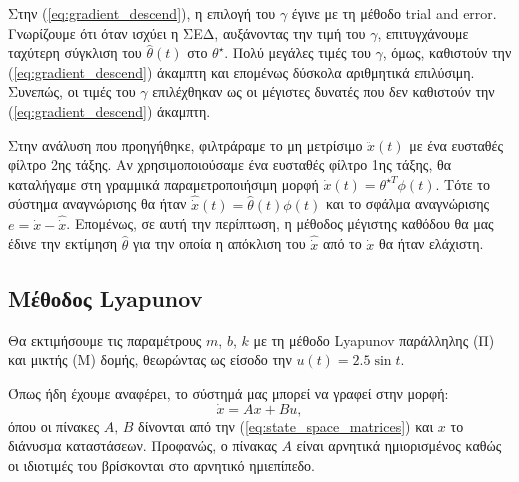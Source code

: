 \documentclass[a4paper,12pt]{article}
\begin{document}
Στην (\ref{eq:gradient_descend}), η επιλογή του $\gamma$ έγινε με τη μέθοδο trial and 
error. Γνωρίζουμε ότι όταν ισχύει η ΣΕΔ, αυξάνοντας την τιμή του $\gamma$, επιτυγχάνουμε 
ταχύτερη σύγκλιση του $\hat{\theta}(t)$ στο $\theta^{\star}$. Πολύ μεγάλες τιμές του $\gamma$, όμως, καθιστούν 
την (\ref{eq:gradient_descend}) άκαμπτη και επομένως δύσκολα αριθμητικά επιλύσιμη. Συνεπώς, οι τιμές του 
$\gamma$ επιλέχθηκαν ως οι μέγιστες δυνατές που δεν καθιστούν την (\ref{eq:gradient_descend}) άκαμπτη.

Στην ανάλυση που προηγήθηκε, φιλτράραμε το μη μετρίσιμο $\ddot{x}(t)$ με ένα ευσταθές φίλτρο 2ης τάξης. Αν 
χρησιμοποιούσαμε ένα ευσταθές φίλτρο 1ης τάξης, θα καταλήγαμε στη γραμμικά παραμετροποιήσιμη μορφή
$\dot{x}(t) = \theta^{\star T} \phi(t)$. Τότε το σύστημα αναγνώρισης θα ήταν 
$\hat{\dot{x}}(t) = \hat{\theta}(t)\phi(t)$ και το σφάλμα αναγνώρισης $e = \dot{x} - \hat{\dot{x}}$. 
Επομένως, σε αυτή την περίπτωση, η μέθοδος μέγιστης καθόδου θα μας έδινε την εκτίμηση $\hat{\theta}$ για την 
οποία η απόκλιση του $\hat{\dot{x}}$ από το $\dot{x}$ θα ήταν ελάχιστη.


\subsection*{Μέθοδος Lyapunov}
Θα εκτιμήσουμε τις παραμέτρους $m$, $b$, $k$ με τη μέθοδο Lyapunov
παράλληλης (Π) και μικτής (Μ) δομής, θεωρώντας ως είσοδο την $u(t) = 2.5 \sin t$.

Όπως ήδη έχουμε αναφέρει, το σύστημά μας μπορεί να γραφεί στην μορφή:
\begin{equation*}
    \dot{x} = Ax + Bu,
\end{equation*}
όπου οι πίνακες $A, \, B$ δίνονται από την (\ref{eq:state_space_matrices}) και $x$ το διάνυσμα καταστάσεων.
Προφανώς, ο πίνακας $A$ είναι αρνητικά ημιορισμένος καθώς οι ιδιοτιμές του βρίσκονται στο αρνητικό ημιεπίπεδο.
\end{document}
